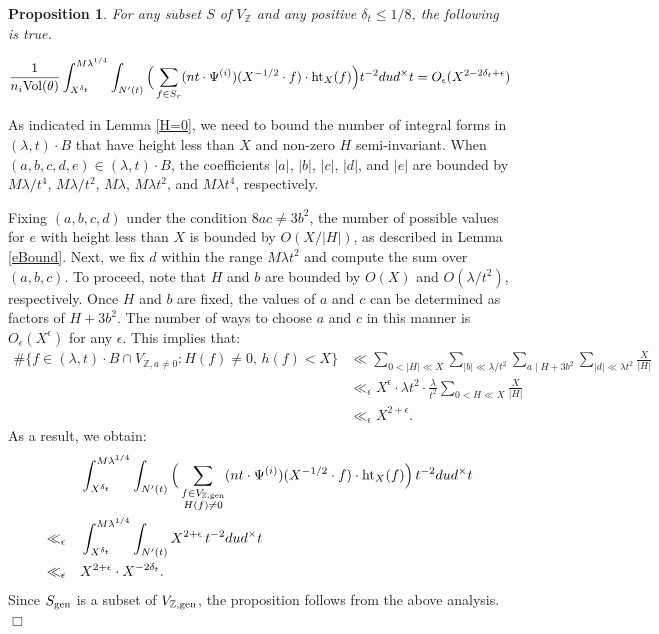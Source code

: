 \documentclass{article}
\def\Z{{\mathbb Z}}
\def\gen{{\rm gen}}
\def\Vol{{\rm Vol}}
\def\Z{{\mathbb Z}}
\def \h{{\rm ht}}
\newtheorem{proposition}[theorem]{Proposition}
\newenvironment{proof}{\noindent {\bf Proof:}}{$\Box$ \vspace{2 ex}}
\def \dw{{t^{-2}dud^\times t  }}
\begin{document}
\begin{proposition}\label{smallt}
For any subset $S$ of $V_{\mathbb{Z}}$ and any positive $\delta_t \leq 1/8$, the following is true.

\begin{equation*} 
\frac{1}{n_i \Vol(\theta)} \int_{X^{\delta_t}}^{M\lambda^{1/4}}\int_{N'(t)} 
     \Big( \sum_{\substack{f \in S_r}} (nt \cdot \Psi^{(i)})(X^{-1/2} \cdot f) \cdot \h_{X}(f) \Big)\dw  = O_{\epsilon}(X^{2-2\delta_t+\epsilon})
\end{equation*}
\end{proposition}
\begin{proof}
As indicated in Lemma \ref{H=0}, we need to bound the number of integral forms in $(\lambda, t) \cdot B$ that have height less than $X$ and non-zero $H$ semi-invariant. When $(a, b, c, d, e) \in (\lambda, t) \cdot B$, the coefficients $|a|$, $|b|$, $|c|$, $|d|$, and $|e|$ are bounded by $M\lambda / t^4$, $M\lambda / t^2$, $M\lambda$, $M\lambda t^2$, and $M\lambda t^4$, respectively.

Fixing $(a, b, c, d)$ under the condition $8ac \neq 3b^2$, the number of possible values for $e$ with height less than $X$ is bounded by $O(X / |H|)$, as described in Lemma \ref{eBound}. Next, we fix $d$ within the range $M\lambda t^2$ and compute the sum over $(a, b, c)$. To proceed, note that $H$ and $b$ are bounded by $O(X)$ and $O(\lambda / t^2)$, respectively. Once $H$ and $b$ are fixed, the values of $a$ and $c$ can be determined as factors of $H + 3b^2$. The number of ways to choose $a$ and $c$ in this manner is $O_{\epsilon}(X^{\epsilon})$ for any $\epsilon$. This implies that:
\begin{align*}
 \# \Big\{f \in (\lambda,t) \cdot B \cap V_{\Z, a\neq 0}: H(f) \neq 0, \, h(f)<X\Big\}  
 &\ll \sum_{0<|H|\ll X} \sum_{|b| \ll \lambda /t^2} \sum_{a\mid H+3b^2} \sum_{|d|\ll \lambda t^2}\frac{X}{|H|} \\
&\ll_{\epsilon} X^{\epsilon} \cdot \lambda t^2\cdot \frac{\lambda}{t^2} \sum_{0<H\ll X} \frac{X}{|H|} \\
&\ll_{\epsilon} 
X^{2+\epsilon}.
\end{align*}
As a result, we obtain:
\begin{align*} &\int_{X^{\delta_t}}^{M\lambda^{1/4}}\int_{N'(t)}   \Big( \sum_{\substack{f \in V_{\Z, \gen} \\ H(f) \neq 0}} (nt \cdot \Psi^{(i)})(X^{-1/2} \cdot f) \cdot \h_{X}(f) \Big) \, \dw \\ \ll_{\epsilon}  \quad
&\int_{X^{\delta_t}}^{M\lambda^{1/4}}\int_{N'(t)}   X^{2+\epsilon} \, \dw \\ \ll_{\epsilon} \quad
&X^{2+\epsilon}  \cdot X^{-2\delta_t}. \end{align*}
Since $S_{\gen}$ is a subset of $V_{\mathbb{Z}, \gen}$, the proposition follows from the above analysis.
\end{proof}
\end{document}
